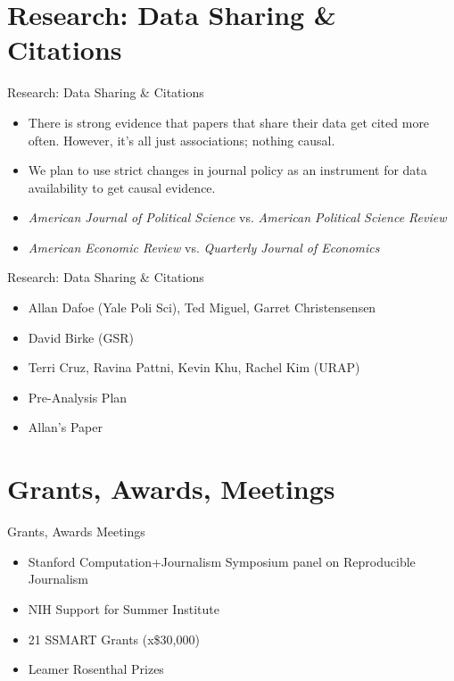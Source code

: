 \documentclass{beamer}
\begin{document}
\section{Research: Data Sharing \& Citations}
\begin{frame}{Research: Data Sharing \& Citations}
\begin{itemize}
\item There is strong evidence that papers that share their data get cited more often. However, it's all just associations; nothing causal.

\item We plan to use strict changes in journal policy as an instrument for data availability to get causal evidence. 

\item \textit{American Journal of Political Science} vs. \textit{American Political Science Review}

\item \textit{American Economic Review} vs. \textit{Quarterly Journal of Economics}
\end{itemize}
\end{frame}

\begin{frame}{Research: Data Sharing \& Citations}
\begin{itemize}
\item Allan Dafoe (Yale Poli Sci), Ted Miguel, Garret Christensensen
\item David Birke (GSR)
\item Terri Cruz, Ravina Pattni, Kevin Khu, Rachel Kim (URAP)
\item Pre-Analysis Plan \href{https://osf.io/qxpr6/}{}
\item Allan's Paper \href{https://osf.io/br4dy/}{}
\end{itemize}
\end{frame}

\section{Grants, Awards, Meetings}
\begin{frame}{Grants, Awards Meetings}
\begin{itemize}
\item Stanford Computation+Journalism Symposium panel on Reproducible Journalism
\item NIH Support for Summer Institute
\item 21 SSMART Grants (x\$30,000) \href{https://osf.io/5x89z/}{}
\item Leamer Rosenthal Prizes
\end{itemize}
\end{frame}
\end{document}
